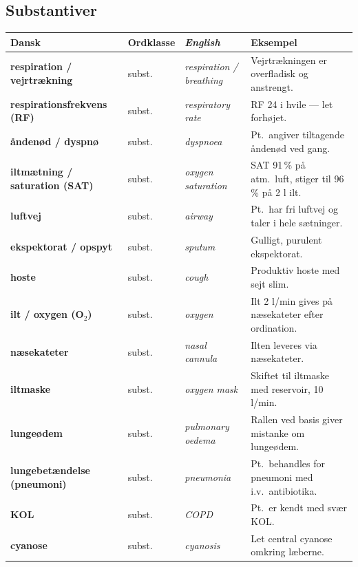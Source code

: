 \documentclass[11pt,a4paper]{report}
\makeatletter
\newcommand{\eng}[1]{\textcolor{en}{\itshape #1}}       %
\newcommand{\da}[1]{\textbf{#1}}
\newenvironment{glos}{%
  \small\renewcommand{\arraystretch}{1.35}
  \begin{longtable}{@{}>{\raggedright\arraybackslash}p{3.3cm}
                        >{\raggedright\arraybackslash}p{1.7cm}
                        >{\raggedright\arraybackslash}p{3.2cm}
                        >{\raggedright\arraybackslash}p{6.0cm}@{}}
  \toprule
  \textbf{Dansk} & \textbf{Ordklasse} & \eng{English} & \textbf{Eksempel} \\ \midrule
  \endhead
}{\bottomrule\end{longtable}}
\makeatother
\begin{document}
\subsection{Substantiver}
\begin{glos}
\da{respiration / vejrtrækning} & subst. & \eng{respiration / breathing} & Vejrtrækningen er overfladisk og anstrengt. \\
\da{respirationsfrekvens (RF)} & subst. & \eng{respiratory rate} & RF 24 i hvile --- let forhøjet. \\
\da{åndenød / dyspnø} & subst. & \eng{dyspnoea} & Pt.\ angiver tiltagende åndenød ved gang. \\
\da{iltmætning / saturation (SAT)} & subst. & \eng{oxygen saturation} & SAT 91\,\% på atm.\ luft, stiger til 96\,\% på 2 l ilt. \\
\da{luftvej} & subst. & \eng{airway} & Pt.\ har fri luftvej og taler i hele sætninger. \\
\da{ekspektorat / opspyt} & subst. & \eng{sputum} & Gulligt, purulent ekspektorat. \\
\da{hoste} & subst. & \eng{cough} & Produktiv hoste med sejt slim. \\
\da{ilt / oxygen (O$_2$)} & subst. & \eng{oxygen} & Ilt 2 l/min gives på næsekateter efter ordination. \\
\da{næsekateter} & subst. & \eng{nasal cannula} & Ilten leveres via næsekateter. \\
\da{iltmaske} & subst. & \eng{oxygen mask} & Skiftet til iltmaske med reservoir, 10 l/min. \\
\da{lungeødem} & subst. & \eng{pulmonary oedema} & Rallen ved basis giver mistanke om lungeødem. \\
\da{lungebetændelse (pneumoni)} & subst. & \eng{pneumonia} & Pt.\ behandles for pneumoni med i.v.\ antibiotika. \\
\da{KOL} & subst. & \eng{COPD} & Pt.\ er kendt med svær KOL. \\
\da{cyanose} & subst. & \eng{cyanosis} & Let central cyanose omkring læberne. \\
\end{glos}
\end{document}

